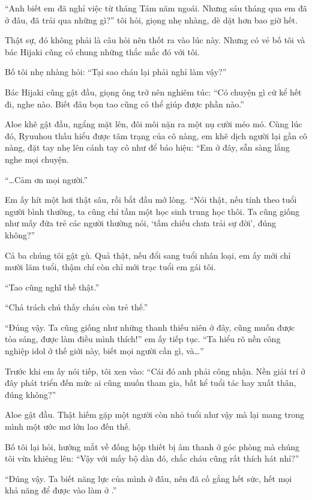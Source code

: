 \documentclass[../main.tex]{subfiles}
\begin{document}
``Anh biết em đã nghỉ việc từ tháng Tám năm ngoái. Nhưng sáu tháng qua em đã ở đâu, đã trải qua những gì?'' tôi hỏi, giọng nhẹ nhàng, dè dặt hơn bao giờ hết.

Thật sự, đó không phải là câu hỏi nên thốt ra vào lúc này. Nhưng có vẻ bố tôi và bác Hijaki cũng có chung những thắc mắc đó với tôi.

Bố tôi nhẹ nhàng hỏi: ``Tại sao cháu lại phải nghỉ làm vậy?''

Bác Hijaki cũng gật đầu, giọng ông trở nên nghiêm túc: ``Có chuyện gì cứ kể hết đi, nghe nào. Biết đâu bọn tao cũng có thể giúp được phần nào.''

Aloe khẽ gật đầu, ngẩng mặt lên, đôi môi nặn ra một nụ cười méo mó. Cùng lúc đó, Ryuuhou thấu hiểu được tâm trạng của cô nàng, em khẽ dịch người lại gần cô nàng, đặt tay nhẹ lên cánh tay cô như để báo hiệu: ``Em ở đây, sẵn sàng lắng nghe mọi chuyện.

``\dots Cảm ơn mọi người.''

Em ấy hít một hơi thật sâu, rồi bắt đầu mở lòng. ``Nói thật, nếu tính theo tuổi người bình thường, ta cũng chỉ tầm một học sinh trung học thôi. Ta cũng giống như mấy đứa trẻ các người thường nói, `tấm chiếu chưa trải sự đời', đúng không?''

Cả ba chúng tôi gật gù. Quả thật, nếu đổi sang tuổi nhân loại, em ấy mới chỉ mười lăm tuổi, thậm chí còn chỉ mới trạc tuổi em gái tôi.

``Tao cũng nghĩ thế thật.''

``Chả trách chú thấy cháu còn trẻ thế.''

``Đúng vậy. Ta cũng giống như những thanh thiếu niên ở đây, cũng muốn được tỏa sáng, được làm điều mình thích!'' em ấy tiếp tục. ``Ta hiểu rõ nền công nghiệp idol ở thế giới này, biết mọi người cần gì, và\dots''

Trước khi em ấy nói tiếp, tôi xen vào: ``Cái đó anh phải công nhận. Nền giải trí ở đây phát triển đến mức ai cũng muốn tham gia, bất kể tuổi tác hay xuất thân, đúng không?''

Aloe gật đầu. Thật hiếm gặp một người còn nhỏ tuổi như vậy mà lại mang trong mình một ước mơ lớn lao đến thế.

Bố tôi lại hỏi, hướng mắt về đống hộp thiết bị âm thanh ở góc phòng mà chúng tôi vừa khiêng lên: ``Vậy với mấy bộ dàn đó, chắc cháu cũng rất thích hát nhỉ?''

``Đúng vậy. Ta biết năng lực của mình ở đâu, nên đã cố gắng hết sức, hết mọi khả năng để được vào làm ở \hll.''
\end{document}
